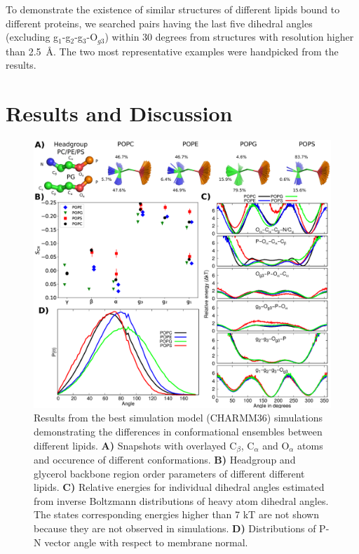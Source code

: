 \documentclass[aps,prl,superscriptaddress,twocolumn]{revtex4}
\begin{document}
To demonstrate the existence of similar structures of different lipids bound to different proteins,
we searched pairs having the last five dihedral angles (excluding g$_1$-g$_2$-g$_3$-O$_{g3}$) within
30 degrees from structures with resolution higher than 2.5~\AA. The two most representative examples
were handpicked from the results.


\section{Results and Discussion}

\begin{figure}[bt]
  \centering
   \includegraphics[width=18.0cm]{./Figs/figure2.eps}
   \caption{\label{structures}
     Results from the best simulation model (CHARMM36) simulations demonstrating the differences in conformational ensembles between different lipids. 
     \textbf{A)} Snapshots with overlayed C$_\beta$, C$_\alpha$ and O$_\alpha$ atoms and occurence of different conformations.
     \textbf{B)} Headgroup and glycerol backbone region order parameters of different different lipids.
     \textbf{C)} Relative energies for individual dihedral angles estimated from inverse Boltzmann distributions of heavy atom dihedral angles.
     The states corresponding energies higher than 7 kT are not shown because they are not observed in simulations.
     \textbf{D)} Distributions of P-N vector angle with respect to membrane normal.
  }
\end{figure}
\end{document}
